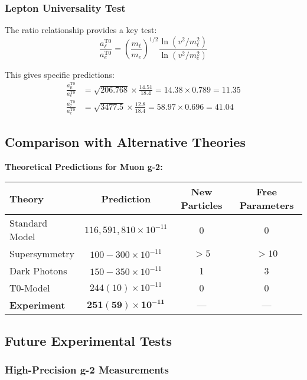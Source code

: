 \documentclass[12pt,a4paper]{article}
\theoremstyle{definition}
\begin{document}
\subsubsection{Lepton Universality Test}

The ratio relationship provides a key test:
\begin{equation}
	\frac{a_{\ell}^{\text{T0}}}{a_{e}^{\text{T0}}} = \left(\frac{m_\ell}{m_e}\right)^{1/2} \frac{\ln(v^2/m_\ell^2)}{\ln(v^2/m_e^2)}
\end{equation}

This gives specific predictions:
\begin{align}
	\frac{a_\mu^{\text{T0}}}{a_e^{\text{T0}}} &= \sqrt{206.768} \times \frac{14.51}{18.4} = 14.38 \times 0.789 = 11.35 \\
	\frac{a_\tau^{\text{T0}}}{a_e^{\text{T0}}} &= \sqrt{3477.5} \times \frac{12.8}{18.4} = 58.97 \times 0.696 = 41.04
\end{align}

\subsection{Comparison with Alternative Theories}

\noindent
\textbf{Theoretical Predictions for Muon g-2:}

\begin{center}
	\begin{tabular}{lccc}
		\toprule
		\textbf{Theory} & \textbf{Prediction} & \textbf{New Particles} & \textbf{Free Parameters} \\
		\midrule
		Standard Model & $116,591,810 \times 10^{-11}$ & 0 & 0 \\
		Supersymmetry & $100-300 \times 10^{-11}$ & $>5$ & $>10$ \\
		Dark Photons & $150-350 \times 10^{-11}$ & 1 & 3 \\
		T0-Model & $244(10) \times 10^{-11}$ & 0 & 0 \\
		\textbf{Experiment} & $\mathbf{251(59) \times 10^{-11}}$ & --- & --- \\
		\bottomrule
	\end{tabular}
\end{center}

\subsection{Future Experimental Tests}

\subsubsection{High-Precision g-2 Measurements}
\end{document}
